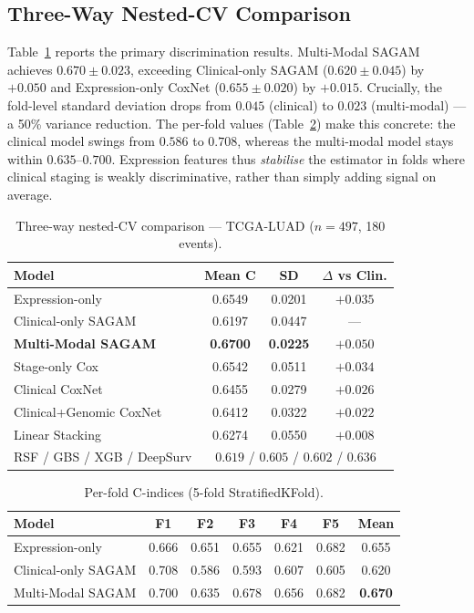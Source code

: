 \documentclass[journal]{IEEEtran}
\begin{document}
\subsection{Three-Way Nested-CV Comparison}
Table~\ref{tab:3way} reports the primary discrimination results.
Multi-Modal SAGAM achieves $0.670\pm0.023$, exceeding Clinical-only SAGAM
($0.620\pm0.045$) by $+0.050$ and Expression-only CoxNet ($0.655\pm0.020$) by
$+0.015$. Crucially, the fold-level standard deviation drops from $0.045$
(clinical) to $0.023$ (multi-modal) --- a 50\% variance reduction. The
per-fold values (Table~\ref{tab:folds}) make this concrete: the clinical model
swings from $0.586$ to $0.708$, whereas the multi-modal model stays within
$0.635$--$0.700$. Expression features thus \emph{stabilise} the estimator in
folds where clinical staging is weakly discriminative, rather than simply
adding signal on average.

\begin{table}[!t]
\centering
\caption{Three-way nested-CV comparison --- TCGA-LUAD ($n{=}497$, 180 events).}
\label{tab:3way}
\begin{tabular}{lccc}
\toprule
\textbf{Model} & \textbf{Mean C} & \textbf{SD} & \textbf{$\Delta$ vs Clin.}\\
\midrule
Expression-only            & 0.6549 & 0.0201 & $+0.035$ \\
Clinical-only SAGAM        & 0.6197 & 0.0447 & --- \\
\textbf{Multi-Modal SAGAM} & \textbf{0.6700} & \textbf{0.0225} & $\mathbf{+0.050}$ \\
\midrule
Stage-only Cox             & 0.6542 & 0.0511 & $+0.034$ \\
Clinical CoxNet            & 0.6455 & 0.0279 & $+0.026$ \\
Clinical+Genomic CoxNet    & 0.6412 & 0.0322 & $+0.022$ \\
Linear Stacking            & 0.6274 & 0.0550 & $+0.008$ \\
\midrule
RSF / GBS / XGB / DeepSurv & \multicolumn{3}{c}{$0.619$ / $0.605$ / $0.602$ / $0.636$}\\
\bottomrule
\end{tabular}
\end{table}

\begin{table}[!t]
\centering
\caption{Per-fold C-indices (5-fold StratifiedKFold).}
\label{tab:folds}
\begin{tabular}{lcccccc}
\toprule
\textbf{Model} & \textbf{F1} & \textbf{F2} & \textbf{F3} & \textbf{F4} & \textbf{F5} & \textbf{Mean}\\
\midrule
Expression-only     & 0.666 & 0.651 & 0.655 & 0.621 & 0.682 & 0.655 \\
Clinical-only SAGAM & 0.708 & 0.586 & 0.593 & 0.607 & 0.605 & 0.620 \\
Multi-Modal SAGAM   & 0.700 & 0.635 & 0.678 & 0.656 & 0.682 & \textbf{0.670} \\
\bottomrule
\end{tabular}
\end{table}
\end{document}

